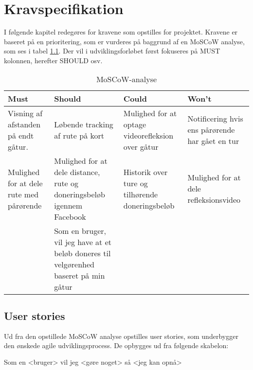 \thispagestyle{fancy}
\chapter{Kravspecifikation}
\label{chp:kravspec}

I følgende kapitel redegøres for kravene som opstilles for projektet. Kravene er baseret på en prioritering, som er vurderes på baggrund af en MoSCoW analyse, som ses i tabel \ref{tab:MosCoW}. Der vil i udviklingsforløbet først fokuseres på MUST kolonnen, herefter SHOULD osv. 


\begin{table}[h]
\begin{tabular}{|>{\rr}p{3.2cm}|>{\rr}p{3.2cm}|>{\rr}p{3.2cm}|p{3.2cm}|} 
\hline
\rowcolor{ThemeColor!80}  
\rowcolor{ThemeColor!80} \vspace{0.2cm}  \textbf{Must} \newline & \vspace{0.2cm}  \textbf{Should} & \vspace{0.2cm}  \textbf{Could} &  \vspace{0.2cm} \textbf{Won't} \\ 
\hline
 Visning af afstanden på endt gåtur.   & Løbende tracking af rute på kort & Mulighed for at optage videorefleksion over gåtur & Notificering hvis ens pårørende har gået en tur \vspace{1cm} \\
\hline 
Mulighed for at dele rute med pårørende & Mulighed for at dele distance, rute og doneringsbeløb igennem Facebook &  Historik over ture og tilhørende doneringsbeløb & Mulighed for at dele refleksionsvideo  \vspace{1cm} \\
\hline
 & Som en bruger, vil jeg have at et beløb doneres til velgørenhed baseret på min gåtur &  &  \\
\hline
\end{tabular}
\caption{MoSCoW-analyse}
\label{tab:MosCoW}
\end{table}
\FloatBarrier


\section{User stories}
Ud fra den opstillede MoSCoW analyse opstilles user stories, som underbygger den ønskede agile udviklingsprocess.
De opbygges ud fra følgende skabelon: \\

\centerline{Som en <bruger> vil jeg <gøre noget> så <jeg kan opnå>}  \hfill

